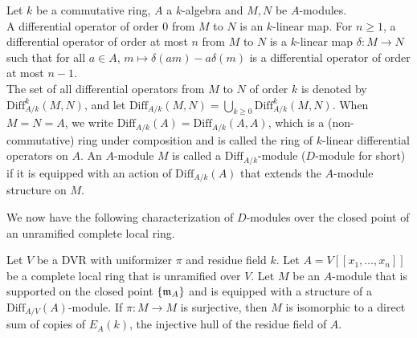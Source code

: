 \begin{definition}
Let $k$ be a commutative ring, $A$ a $k$-algebra and $M,N$ be $A$-modules.\\
\indent A differential operator of order $0$ from $M$ to $N$ is an $k$-linear map. 
For $n \ge 1$, a differential operator of order at most $n$ from $M$ to $N$ is a $k$-linear map 
$\delta: M \to N$ such that for all $a \in A$, $m \mapsto \delta(am)-a\delta(m)$ is a 
differential operator of order at most $n-1$.\\
\indent The set of all differential operators from $M$ to $N$ of order $k$ is denoted by 
$\mathrm{Diff}_{A/k}^k(M,N)$, and let $\mathrm{Diff}_{A/k}(M,N) = \bigcup_{k \ge 0} \mathrm{Diff}_{A/k}^k(M,N)$. When $M=N=A$, 
we write $\mathrm{Diff}_{A/k}(A) = \mathrm{Diff}_{A/k}(A,A)$, 
which is a (non-commutative) ring under composition and is called the ring of $k$-linear differential operators on $A$. An $A$-module 
$M$ is called a $\mathrm{Diff}_{A/k}$-module ($D$-module for short) if it is equipped with an action of $\mathrm{Diff}_{A/k}(A)$ that extends the $A$-module structure on $M$.
\end{definition}
We now have the following characterization of $D$-modules over the closed point of an unramified complete local ring.
\begin{theorem} \label{thm:dmodunram}
Let $V$ be a DVR with uniformizer $\pi$ and residue field $k$. Let $A=V[[x_1, \ldots, x_n]]$ be a complete local ring that is unramified over $V$. 
Let $M$ be an $A$-module that is supported on the closed point $\{\mathfrak{m}_A\}$ and is equipped with a structure of a $\mathrm{Diff}_{A/V}(A)$-module. 
If $\pi: M \to M$ is surjective, then $M$ is isomorphic to a direct sum of copies of $E_A(k)$, the injective hull of the residue field of $A$.
\end{theorem}
